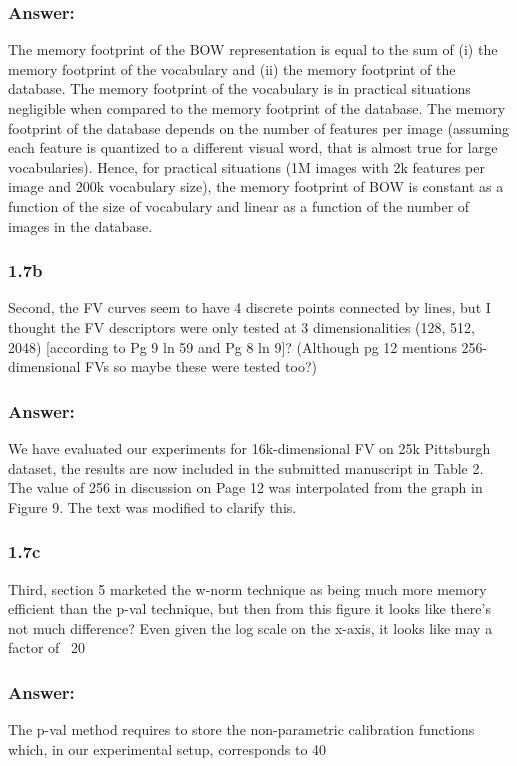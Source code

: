 \documentclass[a4paper,12pt]{article}
\begin{document}
\subsubsection*{Answer:}
The memory footprint of the BOW representation is equal to the sum of (i) the memory footprint of the vocabulary and (ii) the memory footprint of the database. The memory footprint of the vocabulary is in practical situations negligible when compared to the memory footprint of the database. The memory footprint of the database depends on the number of features per image (assuming each feature is quantized to a different visual word, that is almost true for large vocabularies).  Hence, for practical situations (1M images with 2k features per image and 200k vocabulary size), the memory footprint of BOW is constant as a function of the size of vocabulary and linear as a function of the number of images in the database.

\subsubsection*{1.7b}
Second, the FV curves seem to have 4 discrete points connected by lines, but I thought the FV descriptors were only tested at 3 dimensionalities (128, 512, 2048) [according to Pg 9 ln 59 and Pg 8 ln 9]? (Although pg 12 mentions 256-dimensional FVs so maybe these were tested too?)


\subsubsection*{Answer:}
We have evaluated our experiments for 16k-dimensional FV on 25k Pittsburgh dataset, the results are now included in the submitted manuscript in Table 2. The value of 256 in discussion on Page 12 was interpolated from the graph in Figure 9. The text was modified to clarify this.

\subsubsection*{1.7c}
Third, section 5 marketed the w-norm technique as being much more memory efficient than the p-val technique, but then from this figure it looks like there's not much difference? Even given the log scale on the x-axis, it looks like may a factor of ~20%

\subsubsection*{Answer:}
The p-val method requires to store the non-parametric calibration functions which, in our experimental setup, corresponds to 40%
\end{document}
